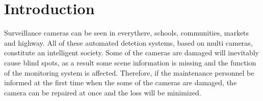 \documentclass[sensors,article,submit,moreauthors,pdftex,10pt,a4paper]{mdpi}
\begin{document}


%
\section{Introduction}

Surveillance cameras can be seen in everythere, schools, communities, markets and highway. All of these automated detetion systems, based on multi cameras, constitute an intelligent society. Some of the cameras are damaged will inevitably cause blind spots, as a result some scene information is missing and the function of the monitoring system is affected. Therefore, if the maintenance personnel be informed at the first time when the some of the cameras are damaged, the camera can be repaired at once and the loss will be minimized.
\end{document}
